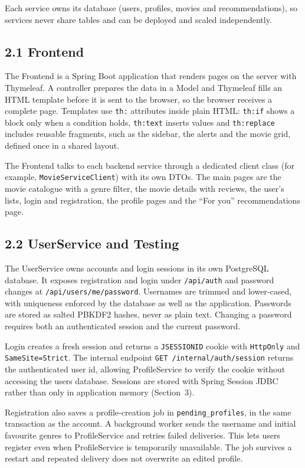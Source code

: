 \documentclass[10pt,a4paper]{article}
\begin{document}
Each service owns its database (users, profiles, movies and recommendations), so services never share tables and can be deployed and scaled independently.

\subsection*{2.1 Frontend}

The Frontend is a Spring Boot application that renders pages on the server with Thymeleaf. A controller prepares the data in a Model and Thymeleaf fills an HTML template before it is sent to the browser, so the browser receives a complete page. Templates use \texttt{th:} attributes inside plain HTML: \texttt{th:if} shows a block only when a condition holds, \texttt{th:text} inserts values and \texttt{th:replace} includes reusable fragments, such as the sidebar, the alerts and the movie grid, defined once in a shared layout.

The Frontend talks to each backend service through a dedicated client class (for example, \texttt{MovieServiceClient}) with its own DTOs. The main pages are the movie catalogue with a genre filter, the movie details with reviews, the user's lists, login and registration, the profile pages and the ``For you'' recommendations page.

\subsection*{2.2 UserService and Testing}

The UserService owns accounts and login sessions in its own PostgreSQL database. It exposes registration and login under \texttt{/api/auth} and password changes at \texttt{/api/users/me/password}. Usernames are trimmed and lower-cased, with uniqueness enforced by the database as well as the application. Passwords are stored as salted PBKDF2 hashes, never as plain text. Changing a password requires both an authenticated session and the current password.

Login creates a fresh session and returns a \texttt{JSESSIONID} cookie with \texttt{HttpOnly} and \texttt{SameSite=Strict}. The internal endpoint \texttt{GET /internal/auth/session} returns the authenticated user id, allowing ProfileService to verify the cookie without accessing the users database. Sessions are stored with Spring Session JDBC rather than only in application memory (Section~3).

Registration also saves a profile-creation job in \texttt{pending\_profiles}, in the same transaction as the account. A background worker sends the username and initial favourite genres to ProfileService and retries failed deliveries. This lets users register even when ProfileService is temporarily unavailable. The job survives a restart and repeated delivery does not overwrite an edited profile.
\end{document}
